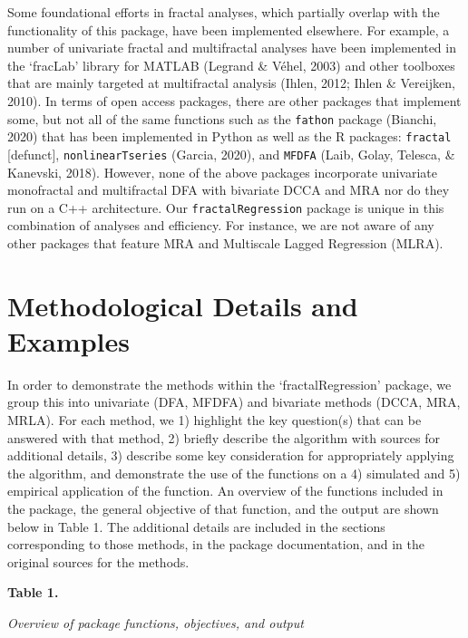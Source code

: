 \documentclass[
  english,
  man]{apa6}
\begin{document}
Some foundational efforts in fractal analyses, which partially overlap
with the functionality of this package, have been implemented elsewhere.
For example, a number of univariate fractal and multifractal analyses
have been implemented in the `fracLab' library for MATLAB (Legrand \& Véhel, 2003)
and other toolboxes that are mainly targeted at multifractal analysis
(Ihlen, 2012; Ihlen \& Vereijken, 2010). In terms of
open access packages, there are other packages that implement some, but
not all of the same functions such as the \texttt{fathon} package
(Bianchi, 2020) that has been implemented in Python as well as the R
packages: \texttt{fractal} {[}defunct{]}, \texttt{nonlinearTseries}
(Garcia, 2020), and \texttt{MFDFA}
(Laib, Golay, Telesca, \& Kanevski, 2018). However, none of the above packages
incorporate univariate monofractal and multifractal DFA with bivariate
DCCA and MRA nor do they run on a C++ architecture. Our
\texttt{fractalRegression} package is unique in this combination of analyses
and efficiency. For instance, we are not aware of any other packages
that feature MRA and Multiscale Lagged Regression (MLRA).

\hypertarget{methodological-details-and-examples}{%
\section{Methodological Details and Examples}\label{methodological-details-and-examples}}

In order to demonstrate the methods within the `fractalRegression'
package, we group this into univariate (DFA, MFDFA) and bivariate
methods (DCCA, MRA, MRLA). For each method, we 1) highlight the key
question(s) that can be answered with that method, 2) briefly describe
the algorithm with sources for additional details, 3) describe some key
consideration for appropriately applying the algorithm, and demonstrate
the use of the functions on a 4) simulated and 5) empirical application
of the function. An overview of the functions included in the package,
the general objective of that function, and the output are shown below
in Table 1. The additional details are included in the sections
corresponding to those methods, in the package documentation, and in the
original sources for the methods.

\textbf{Table 1.}

\emph{Overview of package functions, objectives, and output}
\end{document}
